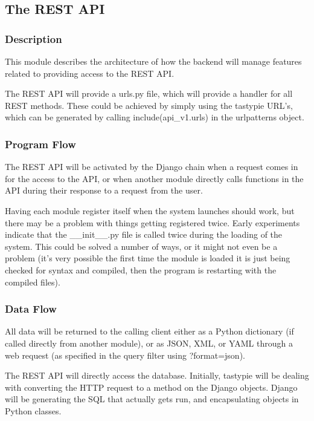 
\subsection{The REST API}

\subsubsection{Description}

This module describes the architecture of how the backend will manage features related to providing access to the REST API.

The REST API will provide a urls.py file, which will provide a handler for all REST methods.
These could be achieved by simply using the tastypie URL's, which can be generated by calling include(api\_v1.urls) in the urlpatterns object.

\subsubsection{Program Flow}

The REST API will be activated by the Django chain when a request comes in for the access to the API, or when another module directly calls functions in the API during their response to a request from the user.

Having each module register itself when the system launches should work, but there may be a problem with things getting registered twice.
Early experiments indicate that the \_\_init\_\_.py file is called twice during the loading of the system.
This could be solved a number of ways, or it might not even be a problem (it's very possible the first time the module is loaded it is just being checked for syntax and compiled, then the program is restarting with the compiled files).

\subsubsection{Data Flow}

All data will be returned to the calling client either as a Python dictionary (if called directly from another module), or as JSON, XML, or YAML through a web request (as specified in the query filter using ?format=json).

The REST API will directly access the database.
Initially, tastypie will be dealing with converting the HTTP request to a method on the Django objects.
Django will be generating the SQL that actually gets run, and encapsulating objects in Python classes.


